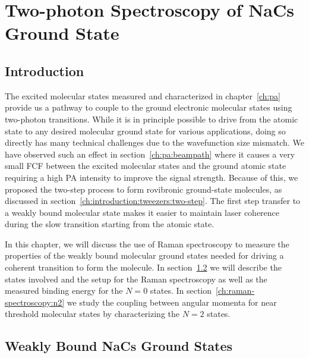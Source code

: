 
\chapter{Two-photon Spectroscopy of NaCs Ground State}
\label{ch:raman-spectroscopy}

\section{Introduction}
\label{ch:raman-spectroscopy:introduction}

The excited molecular states measured and characterized in chapter~\ref{ch:pa}
provide us a pathway to couple to the ground electronic molecular states
using two-photon transitions.
While it is in principle possible to drive from the atomic state
to any desired molecular ground state for various applications,
doing so directly has many technical challenges due to the wavefunction size mismatch.
We have observed such an effect in section~\ref{ch:pa:beampath}
where it causes a very small FCF between the excited molecular states
and the ground atomic state requiring a high PA intensity to improve the signal strength.
Because of this, we proposed the two-step process to form rovibronic ground-state molecules,
as discussed in section~\ref{ch:introduction:tweezers:two-step}.
The first step transfer to a weakly bound molecular state makes it easier
to maintain laser coherence during the slow transition starting from the atomic state.

In this chapter, we will discuss the use of Raman spectroscopy
to measure the properties of the weakly bound molecular ground states
needed for driving a coherent transition to form the molecule.
In section~\ref{ch:raman-spectroscopy:states}
we will describe the states involved and the setup for the Raman spectroscopy
as well as the measured binding energy for the $N=0$ states.
In section~\ref{ch:raman-spectroscopy:n2}
we study the coupling between angular momenta for near threshold molecular states
by characterizing the $N=2$ states.

\section{Weakly Bound NaCs Ground States}
\label{ch:raman-spectroscopy:states}

